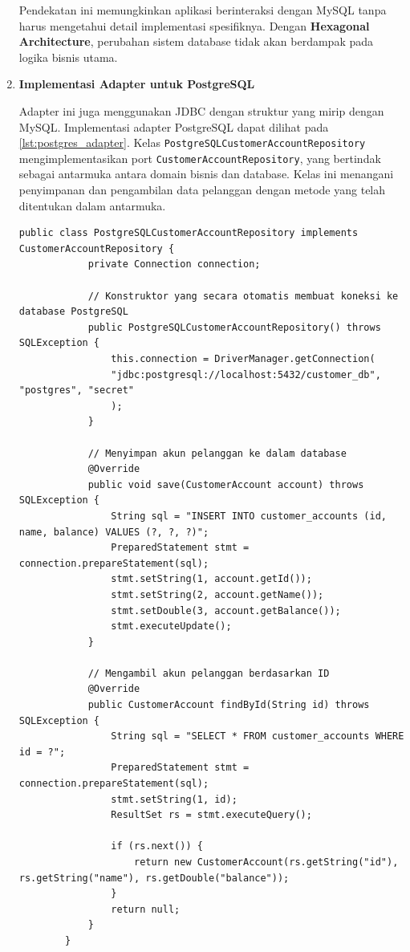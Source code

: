 \begin{enumerate}
	Pendekatan ini memungkinkan aplikasi berinteraksi dengan MySQL tanpa harus mengetahui detail implementasi spesifiknya. Dengan \textbf{Hexagonal Architecture}, perubahan sistem database tidak akan berdampak pada logika bisnis utama.
	

	\item \textbf{Implementasi Adapter untuk PostgreSQL}
	
	Adapter ini juga menggunakan JDBC dengan struktur yang mirip dengan MySQL. Implementasi adapter PostgreSQL dapat dilihat pada \ref{lst:postgres_adapter}. Kelas \texttt{PostgreSQLCus\-tomerAccountRepository} mengimplementasikan port \texttt{CustomerAccountReposito\-ry}, yang bertindak sebagai antarmuka antara domain bisnis dan database. Kelas ini menangani penyimpanan dan pengambilan data pelanggan dengan metode yang telah ditentukan dalam antarmuka.
	
	\begin{lstlisting}[style=JavaStyle, caption=PostgreSQL Adapter Implementation, label=lst:postgres_adapter]
		public class PostgreSQLCustomerAccountRepository implements CustomerAccountRepository {
			private Connection connection;
			
			// Konstruktor yang secara otomatis membuat koneksi ke database PostgreSQL
			public PostgreSQLCustomerAccountRepository() throws SQLException {
				this.connection = DriverManager.getConnection(
				"jdbc:postgresql://localhost:5432/customer_db", "postgres", "secret"
				);
			}
			
			// Menyimpan akun pelanggan ke dalam database
			@Override
			public void save(CustomerAccount account) throws SQLException {
				String sql = "INSERT INTO customer_accounts (id, name, balance) VALUES (?, ?, ?)";
				PreparedStatement stmt = connection.prepareStatement(sql);
				stmt.setString(1, account.getId());
				stmt.setString(2, account.getName());
				stmt.setDouble(3, account.getBalance());
				stmt.executeUpdate();
			}
			
			// Mengambil akun pelanggan berdasarkan ID
			@Override
			public CustomerAccount findById(String id) throws SQLException {
				String sql = "SELECT * FROM customer_accounts WHERE id = ?";
				PreparedStatement stmt = connection.prepareStatement(sql);
				stmt.setString(1, id);
				ResultSet rs = stmt.executeQuery();
				
				if (rs.next()) {
					return new CustomerAccount(rs.getString("id"), rs.getString("name"), rs.getDouble("balance"));
				}
				return null;
			}
		}
	\end{lstlisting}
	

\end{enumerate}
